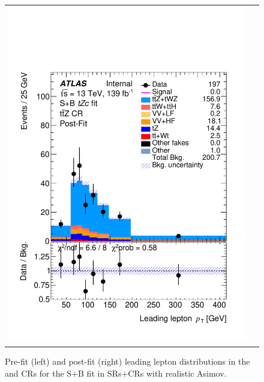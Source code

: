 \begin{figure}[htbp]
\begin{tabular}{cc}
		\includegraphics[width=.45\textwidth]{Chapters/CH8/figures/SPLUSB_CRSR_UsingDL1rcFullSys/Plots/TTZCR_postFit} \\
	\end{tabular}
	\caption{Pre-fit (left) and post-fit (right) leading lepton \pt distributions in the \ttbar and \ttZ CRs for the S+B \tZc fit in SRs+CRs with realistic Asimov.
		\ErrStatSys
	}%
	\label{fig:stat:tzc:splusb:crsr:crplots:2}
\end{figure}

